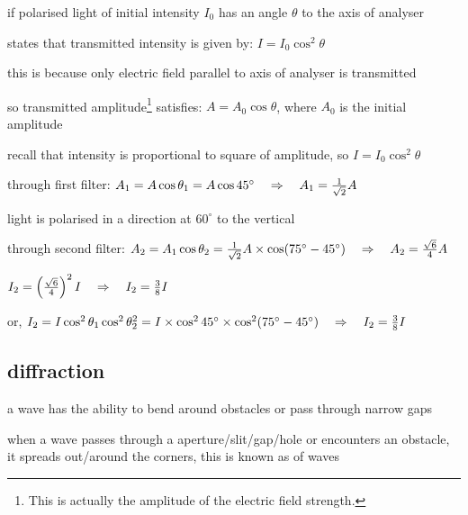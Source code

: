 \cmt if polarised light of initial intensity $I_0$ has an angle $\theta$ to the axis of analyser

 states that transmitted intensity is given by: $\boxed{I = I_0 \cos^2 \theta}$

this is because only electric field parallel to axis of analyser is transmitted

so transmitted amplitude\footnote{This is actually the amplitude of the electric field strength.} satisfies: $A = A_0 \cos\theta$, where $A_0$ is the initial amplitude

recall that intensity is proportional to square of amplitude, so $I = I_0 \cos^2 \theta $


\sol through first filter: $A_1 = A \cos\theta_1 = A \cos 45^\circ \quad \Rightarrow \quad A_1 = \frac{1}{\sqrt{2}} A $

\phantom{through filter: } light is polarised in a direction at $60^\circ$ to the vertical

through second filter: $A_2 = A_1 \cos\theta_2 = \frac{1}{\sqrt{2}} A \times \cos (75^\circ - 45^\circ) \quad \Rightarrow \quad A_2 = \frac{\sqrt{6}}{4} A $

\phantom{through filter: } $I_2 = \left(\frac{\sqrt{6}}{4} \right)^2 I \quad \Rightarrow \quad I_2 = \frac{3}{8} I$

\phantom{through filter: } or, $I_2 = I \cos^2\theta_1 \cos^2 \theta_2^2 = I \times \cos^2 45^\circ \times \cos^2 (75^\circ-45^\circ) \quad \Rightarrow \quad I_2 = \frac{3}{8} I$ \eoe







\subsection{diffraction}

a wave has the ability to bend around obstacles or pass through narrow gaps

\begin{ilight}
	when a wave passes through a aperture/slit/gap/hole or encounters an obstacle, it spreads out/around the corners, this is known as  of waves
\end{ilight}

